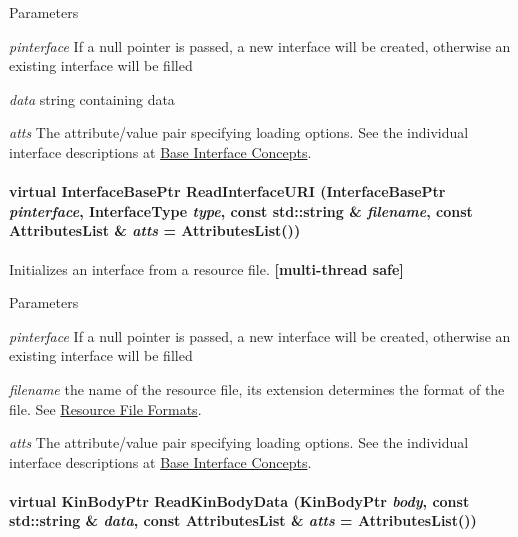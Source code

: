\begin{DoxyParams}{Parameters}
\item[{\em pinterface}]If a null pointer is passed, a new interface will be created, otherwise an existing interface will be filled \item[{\em data}]string containing data \item[{\em atts}]The attribute/value pair specifying loading options. See the individual interface descriptions at \hyperlink{interface__concepts}{Base Interface Concepts}. \end{DoxyParams}
\hypertarget{classOpenRAVE_1_1EnvironmentBase_abe79c2e2ad5f11d0c978269d737816dd}{
\paragraph[{ReadInterfaceURI}]{\setlength{\rightskip}{0pt plus 5cm}virtual InterfaceBasePtr ReadInterfaceURI (InterfaceBasePtr {\em pinterface}, \/  InterfaceType {\em type}, \/  const std::string \& {\em filename}, \/  const AttributesList \& {\em atts} = {\ttfamily AttributesList()})}\hfill}
\label{classOpenRAVE_1_1EnvironmentBase_abe79c2e2ad5f11d0c978269d737816dd}


Initializes an interface from a resource file. {\bfseries \mbox{[}multi-\/thread safe\mbox{]}} 


\begin{DoxyParams}{Parameters}
\item[{\em pinterface}]If a null pointer is passed, a new interface will be created, otherwise an existing interface will be filled \item[{\em filename}]the name of the resource file, its extension determines the format of the file. See \hyperlink{architecture__concepts_supported_formats}{Resource File Formats}. \item[{\em atts}]The attribute/value pair specifying loading options. See the individual interface descriptions at \hyperlink{interface__concepts}{Base Interface Concepts}. \end{DoxyParams}
\hypertarget{classOpenRAVE_1_1EnvironmentBase_a5539fbbaefc308651ace750c133f3adf}{
\paragraph[{ReadKinBodyData}]{\setlength{\rightskip}{0pt plus 5cm}virtual KinBodyPtr ReadKinBodyData (KinBodyPtr {\em body}, \/  const std::string \& {\em data}, \/  const AttributesList \& {\em atts} = {\ttfamily AttributesList()})}\hfill}
\label{classOpenRAVE_1_1EnvironmentBase_a5539fbbaefc308651ace750c133f3adf}



